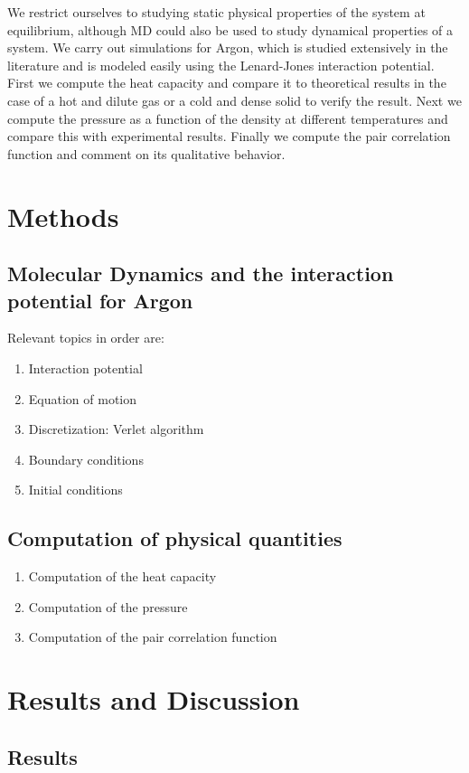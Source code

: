 \documentclass[twoside]{article}
\begin{document}
We restrict ourselves to studying static physical properties of the system at equilibrium, although MD could also be used to study dynamical properties of a system. We carry out simulations for Argon, which is studied extensively in the literature and is modeled easily using the Lenard-Jones interaction potential. First we compute the heat capacity and compare it to theoretical results in the case of a hot and dilute gas or a cold and dense solid to verify the result. Next we compute the pressure as a function of the density at different temperatures and compare this with experimental results. Finally we compute the pair correlation function and comment on its qualitative behavior.


\section{Methods}
\subsection{Molecular Dynamics and the interaction potential for Argon}
Relevant topics in order are:
\begin{enumerate}
\item Interaction potential
\item Equation of motion
\item Discretization: Verlet algorithm
\item Boundary conditions
\item Initial conditions
\end{enumerate}

\subsection{Computation of physical quantities}
\begin{enumerate}
\item Computation of the heat capacity
\item Computation of the pressure
\item Computation of the pair correlation function
\end{enumerate}


\section{Results and Discussion}
\subsection{Results}
\lipsum[5-9]
\end{document}
